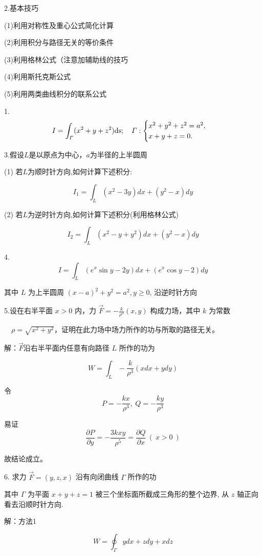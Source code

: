 \documentclass{article}
\begin{document}
2.基本技巧

(1)利用对称性及重心公式简化计算

(2)利用积分与路径无关的等价条件

(3)利用格林公式（注意加辅助线的技巧

(4)利用斯托克斯公式

(5)利用两类曲线积分的联系公式

1.$$I=\int_{\varGamma}(x^2+y+z^2)\rm{d}s; \quad\varGamma:\begin{cases}x^2+y^2+z^2=a^2,\\x+y+z=0.&\end{cases}$$

\newpage

3.假设$L$是以原点为中心，$a$为半径的上半圆周

(1) 若$L$为顺时针方向,如何计算下述积分:

$$I_1 = \int_L (x^2 - 3y)dx + (y^2 - x)dy$$

(2) 若$L$为逆时针方向,如何计算下述积分(利用格林公式)

$$I_2 = \int_L (x^2 - y + y^2)dx + (y^2 - x)dy$$

\newpage

4.$$I = \int_L (e^x \sin y - 2y) dx + (e^x \cos y - 2) dy$$

其中 $L$ 为上半圆周 $(x - a)^2 + y^2 = a^2, y \geq 0$, 沿逆时针方向

\newpage

5.设在右半平面 $x>0$ 内，力 $\vec{F}=-\frac{k}{\rho^{3}}(x, y)$ 构成力场，其中 $k$ 为常数

$\quad \rho=\sqrt{x^{2}+y^{2}}$，证明在此力场中场力所作的功与所取的路径无关。

解：$\vec{F}$沿右半平面内任意有向路径 $L$ 所作的功为

$$W = \int_L -\frac{k}{\rho^3} (x dx + y dy)$$

令 
$$P = -\frac{kx}{\rho^3},\ Q = -\frac{ky}{\rho^3}$$

易证 
$$\frac{\partial P}{\partial y} = -\frac{3kxy}{\rho^5} = \frac{\partial Q}{\partial x}\ (\ x > 0\ )$$

故结论成立。

\newpage

6. 求力 $\vec{F} = (y, z, x)$ 沿有向闭曲线 $\Gamma$ 所作的功

其中 $\Gamma$ 为平面 $x + y + z = 1$ 被三个坐标面所截成三角形的整个边界, 从 $z$ 轴正向看去沿顺时针方向.

解：方法1

$$W = \oint_{\Gamma} ydx + zdy + xdz$$
\end{document}
